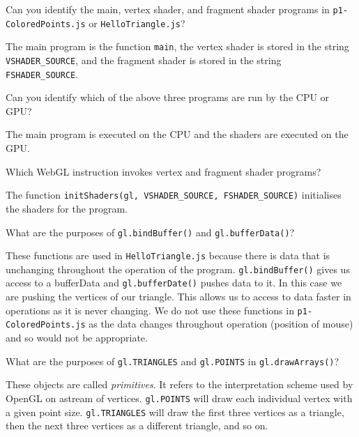 \question Can you identify the main, vertex shader, and fragment shader
programs in \texttt{p1-ColoredPoints.js} or \texttt{HelloTriangle.js}?
\begin{solution}
    The main program is the function \texttt{main}, 
    the vertex shader is stored in the string
    \texttt{VSHADER\_SOURCE},
    and the fragment shader is stored in the string
    \texttt{FSHADER\_SOURCE}.
\end{solution}

\question Can you identify which of the above three programs are run by the
CPU or GPU?
\begin{solution}
    The main program is executed on the CPU and the shaders are executed
    on the GPU.
\end{solution}

\question Which WebGL instruction invokes vertex and fragment shader programs?
\begin{solution}
    The function
    \texttt{initShaders(gl, VSHADER\_SOURCE, FSHADER\_SOURCE)}
    initialises the shaders for the program. 
\end{solution}

\question What are the purposes of \texttt{gl.bindBuffer()} and
\texttt{gl.bufferData()}?
\begin{solution}
    These functions are used in
    \texttt{HelloTriangle.js}
    because there is data that is unchanging throughout the operation
    of the program.
    \texttt{gl.bindBuffer()}
    gives us access to a bufferData and
    \texttt{gl.bufferDate()}
    pushes data to it.
    In this case we are pushing the vertices of our triangle.
    This allows us to access to data faster in operations as it
    is never changing.
    We do not use these functions in \texttt{p1-ColoredPoints.js}
    as the data changes throughout operation (position of mouse)
    and so would not be appropriate.
\end{solution}

\question What are the purposes of \texttt{gl.TRIANGLES} and
\texttt{gl.POINTS} in \texttt{gl.drawArrays()}?
\begin{solution}
    These objects are called \emph{primitives}. 
    It refers to the interpretation scheme used by OpenGL on astream of vertices.
    \texttt{gl.POINTS} will draw each individual vertex with a given
    point size.
    \texttt{gl.TRIANGLES} will draw the first three vertices as a triangle, 
    then the next three vertices as a different triangle, and so on.
\end{solution}